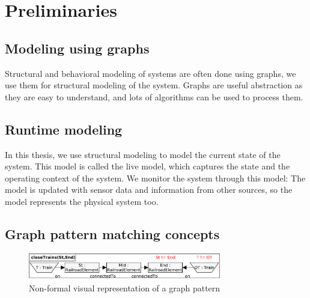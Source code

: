 
\chapter{Preliminaries}



\section{Modeling using graphs}

Structural and behavioral modeling of systems are often done using graphs, we use them for structural modeling of the system. Graphs are useful abstraction as they are easy to understand, and lots of algorithms can be used to process them.

\section{Runtime modeling}

In this thesis, we use structural modeling to model the current state of the system. This model is called the live model, which captures the state and the operating context of the system. We monitor the system through this model: The model is updated with sensor data and information from other sources, so the model represents the physical system too. 

\section{Graph pattern matching concepts}

\begin{figure}[h]
	\begin{center}
		\includegraphics[width=0.75\textwidth]{figures/pattern-visual.pdf}
		\caption{Non-formal visual representation of a graph pattern}
		\label{pattern-visual}
	\end{center}
\end{figure}

